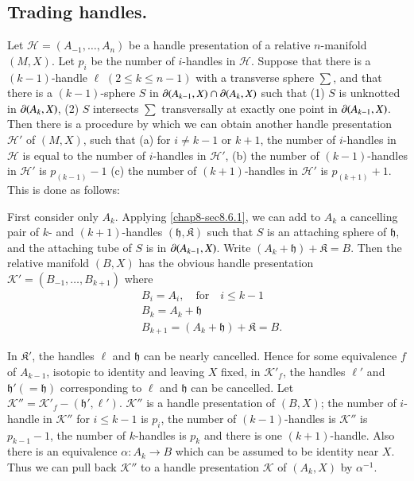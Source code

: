 \subsection{Trading handles.}\label{chap8-sec8.6.2}
Let $\mathscr{H}=(A_{-1},\ldots,A_{n})$ be a handle presentation of a relative $n$-manifold $(M,X)$. Let $p_{i}$ be the number of $i$-handles in $\mathscr{H}$. Suppose that there is a $(k-1)$-handle $\ell$ $(2\leq k\leq n-1)$ with a transverse sphere $\sum$, and that there is a $(k-1)$-sphere $S$ in $\partial(A_{k-1},X)\cap \partial (A_{k},X)$ such that (1) $S$ is unknotted in $\partial(A_{k},X)$, (2) $S$ intersects $\sum$ transversally at exactly one point in $\partial(A_{k-1},X)$. Then there is a procedure by which we can obtain another handle presentation $\mathscr{H}'$ of $(M,X)$, such that (a) for $i\neq k-1$ or $k+1$, the number of $i$-handles in $\mathscr{H}$ is equal to the number of $i$-handles in $\mathscr{H}'$, (b) the number of $(k-1)$-handles in $\mathscr{H}'$ is $p_{(k-1)}-1$ (c) the number of $(k+1)$-handles in $\mathscr{H}'$ is $p_{(k+1)}+1$. This is done as follows:

First consider only $A_{k}$. Applying \ref{chap8-sec8.6.1}, we can add to $A_{k}$ a cancelling pair of $k$- and $(k+1)$-handles $(\mathfrak{h},\mathfrak{K})$ such that $S$ is an attaching sphere of $\mathfrak{h}$, and the attaching tube of $S$ is in $\partial(A_{k-1},X)$. Write $(A_{k}+\mathfrak{h})+\mathfrak{K}=B$. Then the relative manifold $(B,X)$ has the obvious handle presentation $\mathscr{K}'=(B_{-1},\ldots,B_{k+1})$ where 
\begin{align*}
& B_{i}=A_{i},\quad\text{for}\quad i\leq k-1\\
& B_{k}=A_{k}+\mathfrak{h}\\
& B_{k+1}=(A_{k}+\mathfrak{h})+\mathfrak{K}=B.
\end{align*}\pageoriginale

In $\mathfrak{K}'$, the handles $\ell$ and $\mathfrak{h}$ can be nearly cancelled. Hence for some equivalence $f$ of $A_{k-1}$, isotopic to identity and leaving $X$ fixed, in $\mathscr{K}'_{f}$, the handles $\ell'$ and $\mathfrak{h}'(=\mathfrak{h})$ corresponding to $\ell$ and $\mathfrak{h}$ can be cancelled. Let $\mathscr{K}''=\mathscr{K}'_{f}-(\mathfrak{h}',\ell')$. $\mathscr{K}''$ is a handle presentation of $(B,X)$; the number of $i$-handle in $\mathscr{K}''$ for $i\leq k-1$ is $p_{i}$, the number of $(k-1)$-handles is $\mathscr{K}''$ is $p_{k-1}-1$, the number of $k$-handles is $p_{k}$ and there is one $(k+1)$-handle. Also there is an equivalence $\alpha:A_{k}\to B$ which can be assumed to be identity near $X$. Thus we can pull back $\mathscr{K}''$ to a handle presentation $\mathscr{K}$ of $(A_{k},X)$ by $\alpha^{-1}$.

